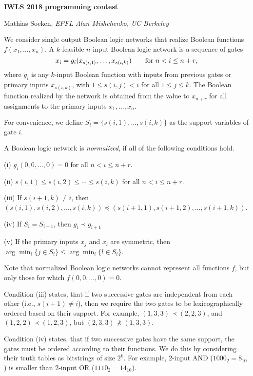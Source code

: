 \parskip3pt
\baselineskip12pt

\centerline{\bf IWLS 2018 programming contest}
\centerline{Mathias Soeken, \sl EPFL \qquad \rm Alan Mishchenko, \sl UC Berkeley}

\bigskip

 \enspace We consider single
output Boolean logic networks that realize Boolean functions $f(x_1,
\dots, x_n)$.  A $k$-feasible $n$-input Boolean logic network is a
sequence of gates
%
$$
  x_i = g_i(x_{s(i,1)}, \dots, x_{s(i,k)}) \qquad\hbox{for $n < i \le n+r$,}
$$
where $g_i$ is any $k$-input Boolean function with inputs from
previous gates or primary inputs $x_{s(i,k)}$, with $1 \le s(i,j) < i$
for all $1 \le j \le k$.  The Boolean function realized by the network
is obtained from the value to $x_{n+r}$ for all assignments to the
primary inputs $x_1, \dots, x_n$.

For convenience, we define $S_i = \{s(i,1), \dots, s(i,k)\}$ as the
support variables of gate $i$.

A Boolean logic network is {\it normalized\/}, if all of the following
conditions hold.
\item{(i)} $g_i(0, 0, \dots, 0) = 0$ for all $n < i \le n+r$.
\item{(ii)} $s(i, 1) \le s(i, 2) \le \cdots \le s(i, k)$ for all $n < i \le n+r$.
\item{(iii)} If $s(i+1,k) \neq i$, then $(s(i,1), s(i,2), \dots,
s(i,k)) \preceq (s(i+1,1), s(i+1,2), \dots, s(i+1,k))$.
\item{(iv)} If $S_i = S_{i+1}$, then $g_i \prec g_{i+1}$
\item{(v)} If the primary inputs $x_j$ and $x_l$ are symmetric, then
$\arg\min_{i} \{j \in S_i\} \le \arg\min_i \{l \in S_i\}$.

Note that normalized Boolean logic networks cannot represent all
functions $f$, but only those for which $f(0, 0, \dots, 0) = 0$.

Condition (iii) states, that if two successive gates are independent
from each other (i.e., $s(i+1) \neq i$), then we require the two gates
to be lexicographically ordered based on their support.  For example,
$(1, 3, 3) \prec (2, 2, 3)$, and $(1, 2, 2) \prec (1, 2, 3)$, but $(2,
3, 3) \not\prec (1, 3, 3)$.

Condition (iv) states, that if two successive gates have the same
support, the gates must be ordered according to their functions.  We
do this by considering their truth tables as bitstrings of size $2^k$.
For example, 2-input AND ($1000_2 = 8_{10}$) is smaller than 2-input
OR ($1110_2 = 14_{10}$).

